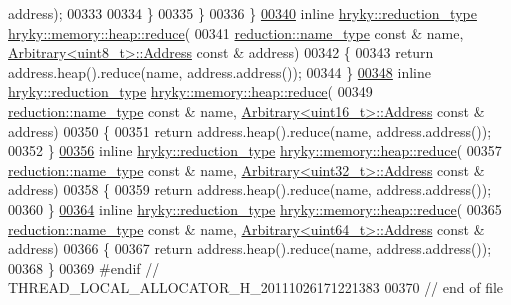 \begin{DoxyCode}
       address);
00333 
00334 \}
00335 \}
00336 \}
\hypertarget{memory__heap__arbitrary_8h_source_l00340}{}\hyperlink{namespacehryky_1_1memory_1_1heap_a1d7e2f4f8ed9a481d8438f7fbfca83e4}{00340} \textcolor{keyword}{inline} \hyperlink{classhryky_1_1_intrusive_ptr}{hryky::reduction_type} \hyperlink{namespacehryky_1_1memory_1_1heap_aa4df42a3456c681bd0b3c0e44fced36b}{hryky::memory::heap::reduce}(
00341     \hyperlink{classhryky_1_1reduction_1_1_string}{reduction::name_type} \textcolor{keyword}{const} & name, \hyperlink{structhryky_1_1memory_1_1heap_1_1_arbitrary_1_1_address}{Arbitrary<uint8_t>::Address} \textcolor{keyword}{const} & 
      address)
00342 \{
00343     \textcolor{keywordflow}{return} address.heap().reduce(name, address.address());
00344 \}
\hypertarget{memory__heap__arbitrary_8h_source_l00348}{}\hyperlink{namespacehryky_1_1memory_1_1heap_a06cc3e810841bb578362b99fa764ee65}{00348} \textcolor{keyword}{inline} \hyperlink{classhryky_1_1_intrusive_ptr}{hryky::reduction_type} \hyperlink{namespacehryky_1_1memory_1_1heap_aa4df42a3456c681bd0b3c0e44fced36b}{hryky::memory::heap::reduce}(
00349     \hyperlink{classhryky_1_1reduction_1_1_string}{reduction::name_type} \textcolor{keyword}{const} & name, \hyperlink{structhryky_1_1memory_1_1heap_1_1_arbitrary_1_1_address}{Arbitrary<uint16_t>::Address} \textcolor{keyword}{const} & 
      address)
00350 \{
00351     \textcolor{keywordflow}{return} address.heap().reduce(name, address.address());
00352 \}
\hypertarget{memory__heap__arbitrary_8h_source_l00356}{}\hyperlink{namespacehryky_1_1memory_1_1heap_ad4c8fb151f03e2346c65228b484c71cc}{00356} \textcolor{keyword}{inline} \hyperlink{classhryky_1_1_intrusive_ptr}{hryky::reduction_type} \hyperlink{namespacehryky_1_1memory_1_1heap_aa4df42a3456c681bd0b3c0e44fced36b}{hryky::memory::heap::reduce}(
00357     \hyperlink{classhryky_1_1reduction_1_1_string}{reduction::name_type} \textcolor{keyword}{const} & name, \hyperlink{structhryky_1_1memory_1_1heap_1_1_arbitrary_1_1_address}{Arbitrary<uint32_t>::Address} \textcolor{keyword}{const} & 
      address)
00358 \{
00359     \textcolor{keywordflow}{return} address.heap().reduce(name, address.address());
00360 \}
\hypertarget{memory__heap__arbitrary_8h_source_l00364}{}\hyperlink{namespacehryky_1_1memory_1_1heap_afeb2dd0bfeaf9e1ec2a81916a4e03066}{00364} \textcolor{keyword}{inline} \hyperlink{classhryky_1_1_intrusive_ptr}{hryky::reduction_type} \hyperlink{namespacehryky_1_1memory_1_1heap_aa4df42a3456c681bd0b3c0e44fced36b}{hryky::memory::heap::reduce}(
00365     \hyperlink{classhryky_1_1reduction_1_1_string}{reduction::name_type} \textcolor{keyword}{const} & name, \hyperlink{structhryky_1_1memory_1_1heap_1_1_arbitrary_1_1_address}{Arbitrary<uint64_t>::Address} \textcolor{keyword}{const} & 
      address)
00366 \{
00367     \textcolor{keywordflow}{return} address.heap().reduce(name, address.address());
00368 \}
00369 \textcolor{preprocessor}{#endif // THREAD\_LOCAL\_ALLOCATOR\_H\_20111026171221383}
00370 \textcolor{preprocessor}{}\textcolor{comment}{// end of file}
\end{DoxyCode}
